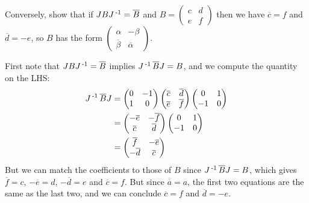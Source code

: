 \documentclass[11pt,onecolumn]{article}
\begin{document}
\begin{exercise}
Conversely, show that if $JBJ\operatorname{^{-1}} = \overline{B}$ and $B =\begin{pmatrix} c & d\\  e & f\end{pmatrix}$ then we have $\overline{c} = f$ and $\overline{d} =-e$, so $B$ has the form $\begin{pmatrix} \alpha &  -\beta \\ \overline{\beta} & \overline{\alpha}\end{pmatrix}$.

\end{exercise}
\begin{answer}
First note that $JBJ\operatorname{^{-1}} = \overline{B}$ implies $J\operatorname{^{-1}} \overline{B} J = B$, and we compute the quantity on the LHS:
\begin{align*}
    J\operatorname{^{-1}} \overline{B} J &= \begin{pmatrix} 0& -1 \\ 1 & 0\end{pmatrix} \begin{pmatrix} \overline{c} & \overline{d} \\ \overline{e} & \overline{f} \end{pmatrix} \begin{pmatrix} 0& 1 \\ -1 & 0\end{pmatrix} \\
    &= \begin{pmatrix} -\overline{e} & - \overline{f} \\ \overline{c} & \overline{d} \end{pmatrix} \begin{pmatrix} 0& 1 \\ -1 & 0\end{pmatrix} \\
    &= \begin{pmatrix} \overline{f} & -\overline{e} \\ -\overline{d} & \overline{c} \end{pmatrix} \\
\end{align*}
But we can match the coefficients to those of $B$ since $J\operatorname{^{-1}} \overline{B} J = B$, which gives $\overline{f} = c$, $-\overline{e} = d$, $-\overline{d} = e$ and $\overline{c} = f$. But since $\overline{\overline{a}}= a$, the first two equations are the same as the last two, and we can conclude $\overline{c}= f$ and $\overline{d} = -e$.


\end{answer}
\end{document}
